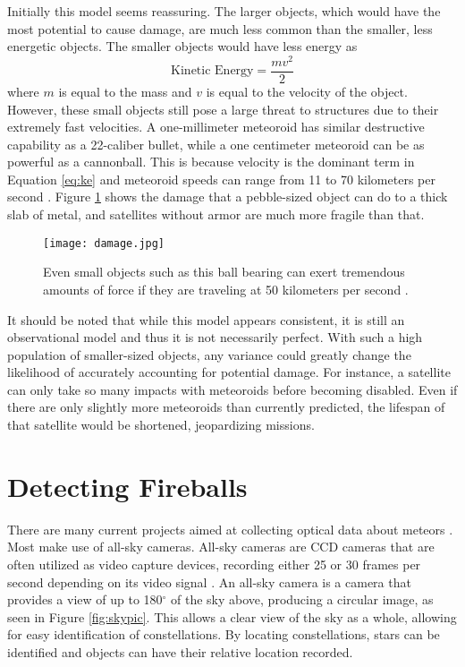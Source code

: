 Initially this model seems reassuring. The larger objects, which would have the most  potential to cause damage, are much less common than the smaller, less energetic objects. The smaller objects would have less energy as 
\begin{equation}
	\textrm{Kinetic Energy} = \frac{mv^2}{2}
	\label{eq:ke}
\end{equation}
where $m$ is equal to the mass and $v$ is equal to the velocity of the object. However, these small objects still pose a large threat to structures due to their extremely fast velocities. A one-millimeter meteoroid has similar destructive capability as a 22-caliber bullet, while a one centimeter meteoroid can be as powerful as a cannonball. This is because velocity is the dominant term in Equation \ref{eq:ke} and meteoroid speeds can range from 11 to 70 kilometers per second \cite{Harbaugh2008}. Figure \ref{fig:damage} shows the damage that a pebble-sized object can do to a thick slab of metal, and satellites without armor are much more fragile than that.

\begin{figure}[ht!]
  \centering
  \texttt{[image: damage.jpg]}
  \caption{Even small objects such as this ball bearing can exert tremendous amounts of force if they are traveling at 50 kilometers per second \protect\cite{ESA2017}.}
  \label{fig:damage}
\end{figure}


It should be noted that while this model appears consistent, it is still an observational model and thus it is not necessarily perfect. With such a high population of smaller-sized objects, any variance could greatly change the likelihood of accurately accounting for potential damage. For instance, a satellite can only take so many impacts with meteoroids before becoming disabled. Even if there are only slightly more meteoroids than currently predicted, the lifespan of that satellite would be shortened, jeopardizing missions. 

\section{Detecting Fireballs}
There are many current projects aimed at collecting optical data about meteors \cite{Jenniskens2011,Trigo-Rodriguez2007,Halliday1996}. Most make use of all-sky cameras. All-sky cameras are CCD cameras that are often utilized as video capture devices, recording either 25 or 30 frames per second depending on its video signal \cite{Molau2005}. An all-sky camera is a camera that provides a view of up to 180$^{\circ}$ of the sky above, producing a circular image, as seen in Figure \ref{fig:skypic}. This allows a clear view of the sky as a whole, allowing for easy identification of constellations. By locating constellations, stars can be identified and objects can have their relative location recorded.

